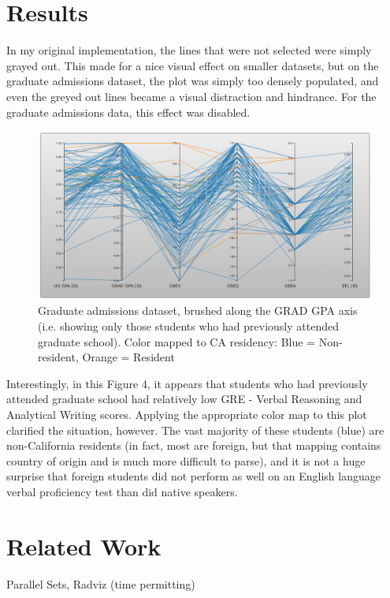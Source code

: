 \documentclass[]{article}
\begin{document}
\section{Results}
	In my original implementation, the lines that were not selected were simply grayed out. This made for a nice visual effect on smaller datasets, but on the graduate admissions dataset, the plot was simply too densely populated, and even the greyed out lines became a visual distraction and hindrance. For the graduate admissions data, this effect was disabled.

	\begin{figure}[h]
		\includegraphics[width=\linewidth]{grads_only.png}
		\caption{Graduate admissions dataset, brushed along the GRAD GPA axis (i.e. showing only those students who had previously attended graduate school). Color mapped to CA residency: Blue = Non-resident, Orange = Resident}
		\label{fig:Grad}
	\end{figure}
	
	Interestingly, in this Figure 4, it appears that students who had previously attended graduate school had relatively low GRE - Verbal Reasoning and Analytical Writing scores. Applying the appropriate color map to this plot clarified the situation, however. The vast majority of these students (blue) are non-California residents (in fact, most are foreign, but that mapping contains country of origin and is much more difficult to parse), and it is not a huge surprise that foreign students did not perform as well on an English language verbal proficiency test than did native speakers.
	
	
\section{Related Work}
	Parallel Sets, Radviz (time permitting)
	
\end{document}
